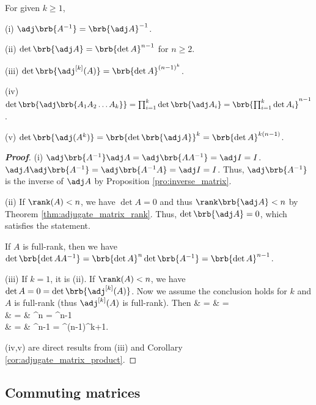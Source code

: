 \begin{proposition}\label{pro:adjugate_matrix_property}
For given $k \geq 1$,
\ben
\item [(i)] $\adj\brb{A^{-1}} = \brb{\adj A}^{-1}$.
\item [(ii)] $\det\brb{\adj A} = \brb{\det A}^{n-1}$ for $n\geq 2$.
\item [(iii)] $\det\brb{\adj^{[k]}(A)} = \brb{\det A}^{(n-1)^k}$.
\item [(iv)] $\det\brb{\adj\brb{A_1A_2\dots A_k}} = \prod^k_{i=1} \det\brb{\adj A_i} = \brb{\prod^k_{i=1} \det A_i}^{n-1}$.
\item [(v)] $\det\brb{\adj (A^k)} = \brb{\det \brb{\adj A}}^k = \brb{\det A}^{k(n-1)}$.
\een
\end{proposition}

\begin{proof}[\bf Proof]
\ben
\item [(i)] $\adj\brb{A^{-1}} \adj A = \adj \brb{A A^{-1}} = \adj I = I$. $\adj A \adj\brb{A^{-1}} = \adj \brb{A^{-1}A} = \adj I = I$. Thus, $\adj\brb{A^{-1}}$ is the inverse of $\adj A$ by Proposition \ref{pro:inverse_matrix}.
\item [(ii)] If $\rank(A) < n$, we have $\det A = 0$ and thus $\rank\brb{\adj A} < n$ by Theorem \ref{thm:adjugate_matrix_rank}. Thus, $\det\brb{\adj A} = 0$, which satisfies the statement.

If $A$ is full-rank, then we have $\det\brb{\det A A^{-1}} = \brb{\det A}^{n} \det\brb{A^{-1}} = \brb{\det A}^{n-1}$.

\item [(iii)] If $k = 1$, it is (ii). If $\rank(A) < n$, we have $\det A = 0 = \det\brb{\adj^{[k]}(A)}$. Now we assume the conclusion holds for $k$ and $A$ is full-rank (thus $\adj^{[k]}(A)$ is full-rank). Then
\beast
\det{} & = & \det {} = \det{} \\
& = & ^{n}\det{} = ^{n-1}\\
& = & ^{n-1} = ^{(n-1)^{k+1}}.
\eeast
\een

(iv,v) are direct results from (iii) and Corollary \ref{cor:adjugate_matrix_product}.
\end{proof}




\subsection{Commuting matrices}

